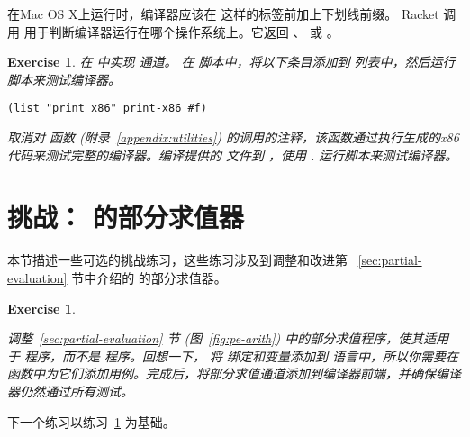 \documentclass[11pt]{book}
\newtheorem{exercise}[theorem]{Exercise}
\begin{document}
在Mac OS X上运行时，编译器应该在  这样的标签前加上下划线前缀。 Racket 调用  用于判断编译器运行在哪个操作系统上。它返回  、 或  。

\begin{exercise}\normalfont
%
在  中实现  通道。
%
在  脚本中，将以下条目添加到  列表中，然后运行脚本来测试编译器。
\begin{lstlisting}
(list "print x86" print-x86 #f)
\end{lstlisting}
%  
取消对  函数
(附录~\ref{appendix:utilities}) 的调用的注释，该函数通过执行生成的x86代码来测试完整的编译器。编译提供的
 文件到  ，使用 . 运行脚本来测试编译器。
\end{exercise}


\section{挑战： \LangVar{} 的部分求值器}
\label{sec:pe-Rvar}

本节描述一些可选的挑战练习，这些练习涉及到调整和改进第 ~\ref{sec:partial-evaluation} 节中介绍的 \LangInt{} 的部分求值器。

\begin{exercise}\label{ex:pe-Rvar}
\normalfont
  
调整~\ref{sec:partial-evaluation} 节
(图~\ref{fig:pe-arith}) 中的部分求值程序，使其适用于 \LangVar{} 程序，而不是 \LangInt{} 程序。回想一下， \LangVar{} 将  绑定和变量添加到 \LangInt{} 语言中，所以你需要在  函数中为它们添加用例。完成后，将部分求值通道添加到编译器前端，并确保编译器仍然通过所有测试。
\end{exercise}

下一个练习以练习~\ref{ex:pe-Rvar} 为基础。
\end{document}
